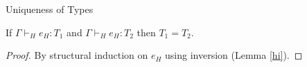 \begin{lemma}
\label{huot}
Uniqueness of Types

If $\Gamma\vdash_{H}e_{H}:T_{1}$ and $\Gamma\vdash_{H}e_{H}:T_{2}$ then $T_{1}=T_{2}$.
\begin{proof}
By structural induction on $e_{H}$ using inversion (Lemma \ref{hi}).
\end{proof}
\end{lemma}